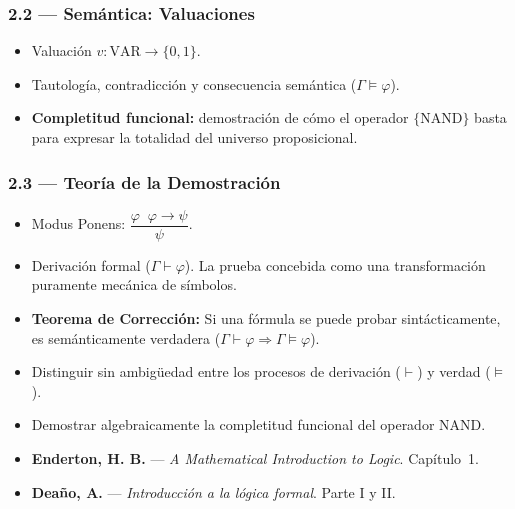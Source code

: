 \documentclass[11pt, letterpaper]{article}
\begin{document}
\subsubsection{2.2 --- Sem\'antica: Valuaciones}
\begin{itemize}
  \item Valuaci\'on $v:\text{VAR}\to\{0,1\}$. 
  \item Tautolog\'ia, contradicci\'on y consecuencia sem\'antica ($\Gamma\models\varphi$).
  \item \textbf{Completitud funcional:} demostraci\'on de c\'omo el operador $\{\text{NAND}\}$ basta para expresar la totalidad del universo proposicional.
\end{itemize}

\subsubsection{2.3 --- Teor\'ia de la Demostraci\'on}
\begin{itemize}
  \item Modus Ponens: $\dfrac{\varphi\;\;\varphi\to\psi}{\psi}$.
  \item Derivaci\'on formal ($\Gamma\vdash\varphi$). La prueba concebida como una transformaci\'on puramente mec\'anica de s\'imbolos.
  \item \textbf{Teorema de Correcci\'on:} Si una f\'ormula se puede probar sint\'acticamente, es sem\'anticamente verdadera ($\Gamma\vdash\varphi \Rightarrow \Gamma\models\varphi$).
\end{itemize}

\begin{objetivos}
\begin{itemize}
  \item Distinguir sin ambig\"uedad entre los procesos de derivaci\'on ($\vdash$) y verdad ($\models$).
  \item Demostrar algebraicamente la completitud funcional del operador NAND.
\end{itemize}
\end{objetivos}

\begin{lecturas}
\begin{itemize}
  \item[$(\star)$] \textbf{Enderton, H. B.} --- \emph{A Mathematical Introduction to Logic}. Cap\'itulo~1.
  \item \textbf{Deaño, A.} --- \emph{Introducci\'on a la l\'ogica formal}. Parte I y II.
\end{itemize}
\end{lecturas}
\end{document}
